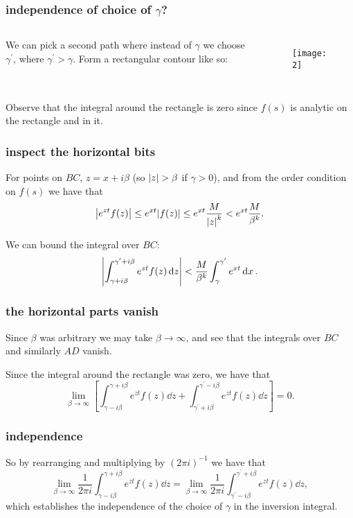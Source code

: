 \documentclass[mathserif]{beamer}
\newcommand{\sbr}[1]{\left[#1\right]}
\begin{document}
\begin{frame}
  \frametitle{independence of choice of $\gamma$?}

  

  \begin{columns}

    We can pick a second path where instead of $\gamma$ we choose $\gamma^{\prime}$, where $\gamma^{\prime}> \gamma$. Form a rectangular contour like so:
    \begin{figure}[h]
      \centering
      \texttt{[image: 2]}
    \end{figure}
  \end{columns}

  \pause Observe that the integral around the rectangle is zero since $f(s)$ is analytic on the rectangle and in it.

\end{frame}

\begin{frame}
  \frametitle{inspect the horizontal bits}

  For points on $BC$, $z = x+i\beta$ (so $\abs{z} > \beta$ if $\gamma > 0$), and from the order condition on $f(s)$ we have that \[\abs{e^{zt}f(z)}\leq e^{xt}\abs{f(z)}\leq e^{xt}\frac{M}{\abs{z}^k} < e^{xt}\frac{M}{\beta^k}.\]

  \pause We can bound the integral over $BC$: \[\abs{\int_{\gamma+i\beta}^{\gamma^{\prime}+i\beta}e^{zt}f(z)\dd{z}} < \frac{M}{\beta^k}\int_{\gamma}^{\gamma^{\prime}}e^{xt}\dd{x}.\]

\end{frame}

\begin{frame}
  \frametitle{the horizontal parts vanish}

  Since $\beta$ was arbitrary we may take $\beta\to \infty$, and see that the integrals over $BC$ and similarly $AD$ vanish.

  \pause Since the integral around the rectangle was zero, we have that \[\lim_{\beta\to\infty}\sbr{\int_{\gamma-i\beta}^{\gamma+i\beta}e^{zt}f(z)\dd{z} + \int_{\gamma^{\prime}+i\beta}^{\gamma^{\prime}-i\beta}e^{zt}f(z)\dd{z}} = 0.\]

\end{frame}

\begin{frame}
  \frametitle{independence}

  So by rearranging and multiplying by $(2\pi i)^{-1}$ we have that \[\lim_{\beta\to\infty}\frac{1}{2\pi i}\int_{\gamma-i\beta}^{\gamma+i\beta}e^{zt}f(z)\dd{z} = \lim_{\beta\to\infty}\frac{1}{2\pi i}\int_{\gamma^{\prime}-i\beta}^{\gamma^{\prime}+i\beta}e^{zt}f(z)\dd{z},\] which establishes the independence of the choice of $\gamma$ in the inversion integral.

\end{frame}
\end{document}
